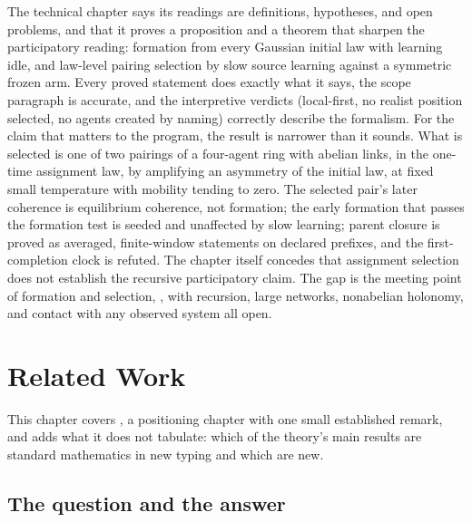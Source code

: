 \begin{verdictbox}{\NARROWER}
The technical chapter says its readings are definitions, hypotheses, and open problems, and that it proves
a proposition and a theorem that sharpen the participatory reading: formation from every Gaussian initial
law with learning idle, and law-level pairing selection by slow source learning against a symmetric
frozen arm. Every proved statement does exactly what it says, the scope paragraph is accurate, and the
interpretive verdicts (local-first, no realist position selected, no agents created by naming) correctly
describe the formalism. For the claim that matters to the program, the result is narrower than it sounds.
What is selected is one of two pairings of a four-agent ring with abelian links, in the one-time
assignment law, by amplifying an asymmetry of the initial law, at fixed small temperature with mobility
tending to zero. The selected pair's later coherence is equilibrium coherence, not formation; the early
formation that passes the formation test is seeded and unaffected by slow learning; parent closure is
proved as averaged, finite-window statements on declared prefixes, and the first-completion clock is
refuted. The chapter itself concedes that assignment selection does not establish the recursive
participatory claim. The gap is the meeting point of formation and selection,
, with recursion, large networks, nonabelian holonomy, and contact
with any observed system all open.
\end{verdictbox}

\chapter{Related Work}
\label{comp:ch15}

This chapter covers , a positioning chapter with one small established remark, and
adds what it does not tabulate: which of the theory's main results are standard mathematics in new
typing and which are new.

\section{The question and the answer}
\label{comp:ch15-question}

